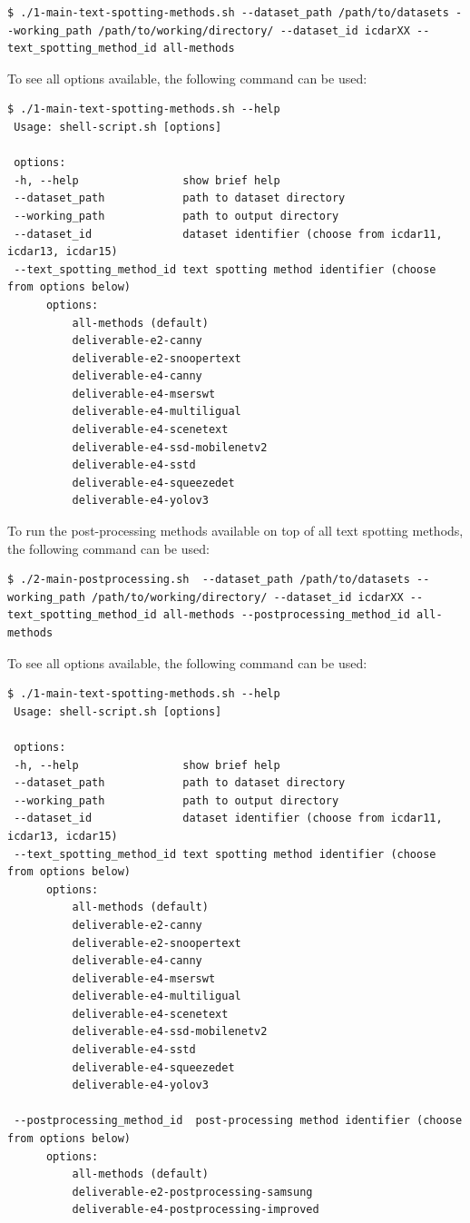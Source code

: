 \begin{lstlisting}[style=fancyterminal]
 $ ./1-main-text-spotting-methods.sh --dataset_path /path/to/datasets --working_path /path/to/working/directory/ --dataset_id icdarXX --text_spotting_method_id all-methods
\end{lstlisting}

To see all options available, the following command can be used:
\begin{lstlisting}[style=fancyterminal]
 $ ./1-main-text-spotting-methods.sh --help
 Usage: shell-script.sh [options]

 options:
 -h, --help                show brief help
 --dataset_path            path to dataset directory
 --working_path            path to output directory
 --dataset_id              dataset identifier (choose from icdar11, icdar13, icdar15)
 --text_spotting_method_id text spotting method identifier (choose from options below)
      options:
          all-methods (default)
          deliverable-e2-canny
          deliverable-e2-snoopertext
          deliverable-e4-canny
          deliverable-e4-mserswt
          deliverable-e4-multiligual
          deliverable-e4-scenetext
          deliverable-e4-ssd-mobilenetv2
          deliverable-e4-sstd
          deliverable-e4-squeezedet
          deliverable-e4-yolov3

\end{lstlisting}

To run the post-processing methods available on top of all text spotting methods, the following command can be used:

\begin{lstlisting}[style=fancyterminal]
 $ ./2-main-postprocessing.sh  --dataset_path /path/to/datasets --working_path /path/to/working/directory/ --dataset_id icdarXX --text_spotting_method_id all-methods --postprocessing_method_id all-methods
\end{lstlisting}

To see all options available, the following command can be used:
\begin{lstlisting}[style=fancyterminal]
 $ ./1-main-text-spotting-methods.sh --help
 Usage: shell-script.sh [options]

 options:
 -h, --help                show brief help
 --dataset_path            path to dataset directory
 --working_path            path to output directory
 --dataset_id              dataset identifier (choose from icdar11, icdar13, icdar15)
 --text_spotting_method_id text spotting method identifier (choose from options below)
      options:
          all-methods (default)
          deliverable-e2-canny
          deliverable-e2-snoopertext
          deliverable-e4-canny
          deliverable-e4-mserswt
          deliverable-e4-multiligual
          deliverable-e4-scenetext
          deliverable-e4-ssd-mobilenetv2
          deliverable-e4-sstd
          deliverable-e4-squeezedet
          deliverable-e4-yolov3
          
 --postprocessing_method_id  post-processing method identifier (choose from options below)
      options:
          all-methods (default)
          deliverable-e2-postprocessing-samsung
          deliverable-e4-postprocessing-improved
\end{lstlisting}

